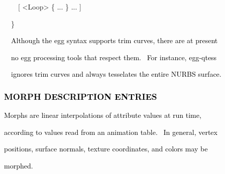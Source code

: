 \documentclass[a4paper]{article}
\newcommand\textstyleOOoComputerKeyWord[1]{\textrm{\textcolor[rgb]{0.0,0.0,0.5019608}{#1}}}
\newcommand\textstyleOOoAssemblerSpecialChar[1]{\textrm{\textcolor[rgb]{0.0,0.5019608,0.0}{#1}}}
\newcommand\textstyleOOoAssemblerIdent[1]{\textrm{\textcolor{black}{#1}}}
\newcommand\textstyleOOoAssemblerInstruction[1]{\textrm{\textcolor[rgb]{0.0,0.0,0.49803922}{#1}}}
\begin{document}
{\color{black}
\textstyleOOoComputerKeyWord{\textcolor{black}{\ \ \ \ }}\textstyleOOoAssemblerSpecialChar{[}\textstyleOOoComputerKeyWord{\textcolor{black}{
}}\textstyleOOoAssemblerSpecialChar{{\textless}}\textstyleOOoAssemblerInstruction{Loop}\textstyleOOoAssemblerSpecialChar{{\textgreater}}\textstyleOOoComputerKeyWord{\textcolor{black}{
}}\textstyleOOoAssemblerSpecialChar{\{}\textstyleOOoComputerKeyWord{\textcolor{black}{
}}\textstyleOOoAssemblerIdent{...}\textstyleOOoComputerKeyWord{\textcolor{black}{
}}\textstyleOOoAssemblerSpecialChar{\}}\textstyleOOoComputerKeyWord{\textcolor{black}{
}}\textstyleOOoAssemblerIdent{...}\textstyleOOoComputerKeyWord{\textcolor{black}{
}}\textstyleOOoAssemblerSpecialChar{]}}

{\color{black}
\textstyleOOoComputerKeyWord{\textcolor{black}{\ \ }}\textstyleOOoAssemblerSpecialChar{\}}}


\bigskip

{\color{black}
\textstyleOOoComputerKeyWord{\textcolor{black}{\ \ Although the egg syntax supports trim curves, there are at present}}}

{\color{black}
\textstyleOOoComputerKeyWord{\textcolor{black}{\ \ no egg processing tools that respect them. \ For instance,
egg-qtess}}}

{\color{black}
\textstyleOOoComputerKeyWord{\textcolor{black}{\ \ ignores trim curves and always tesselates the entire NURBS
surface.}}}


\bigskip


\bigskip

\subsubsection[MORPH DESCRIPTION ENTRIES]{\textstyleOOoComputerKeyWord{\textcolor{black}{MORPH DESCRIPTION ENTRIES}}}
\hypertarget{RefHeading7682869075401}{}
\bigskip

{\color{black}
\textstyleOOoComputerKeyWord{\textcolor{black}{Morphs are linear interpolations of attribute values at run time,}}}

{\color{black}
\textstyleOOoComputerKeyWord{\textcolor{black}{according to values read from an animation table. \ In general, vertex}}}

{\color{black}
\textstyleOOoComputerKeyWord{\textcolor{black}{positions, surface normals, texture coordinates, and colors may be}}}

{\color{black}
\textstyleOOoComputerKeyWord{\textcolor{black}{morphed.}}}
\end{document}
